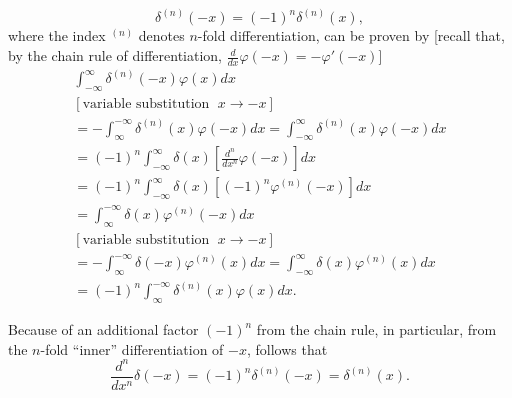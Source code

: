  \begin{equation}
 \delta^{(n)}(-x) =(-1)^n\delta^{(n)}(x)
,
 \end{equation}
where the index $^{(n)}$ denotes $n$-fold differentiation,
can be proven by
[recall that, by the chain rule of differentiation, $\frac{d}{dx} \varphi (-x)  = - \varphi' (-x)$]
{\color{OliveGreen}
\bproof
 \begin{equation}
 \begin{split}
\int _{-\infty}^\infty \delta^{(n)} (-x)  \varphi (x)  dx  \\
[\textrm{variable substitution }\; x \rightarrow -x]\\
=
-\int _\infty^{-\infty} \delta^{(n)} (x)  \varphi (-x) dx
=
\int _{-\infty}^\infty \delta^{(n)} (x)  \varphi (-x) dx \\
 =
(-1)^n \int _{-\infty}^\infty \delta (x) \left[ \frac{d^n}{dx^n}  \varphi  (-x)\right] dx \\
 =
(-1)^n \int _{-\infty}^\infty \delta (x) \left[(-1)^n  \varphi^{(n)} (-x)\right] dx \\
 =
\int _\infty^{-\infty} \delta (x) \varphi^{(n)} (-x) dx \\
[\textrm{variable substitution }\; x \rightarrow -x]\\
=
-\int _\infty^{-\infty} \delta (-x) \varphi^{(n)} (x) dx
=
\int  _{-\infty}^\infty \delta (x) \varphi^{(n)} (x) dx \\
=
(-1)^n\int _\infty^{-\infty} \delta^{(n)} (x) \varphi (x) dx   .
 \end{split}
 \end{equation}
\eproof
}


Because of an additional factor $(-1)^n$ from the chain rule,
in particular, from the $n$-fold ``inner'' differentiation of $-x$, follows that
 \begin{equation}
 \frac{d^n}{dx^n}\delta(-x) = (-1)^n \delta^{(n)}(-x)  = \delta^{(n)}(x).
 \end{equation}

